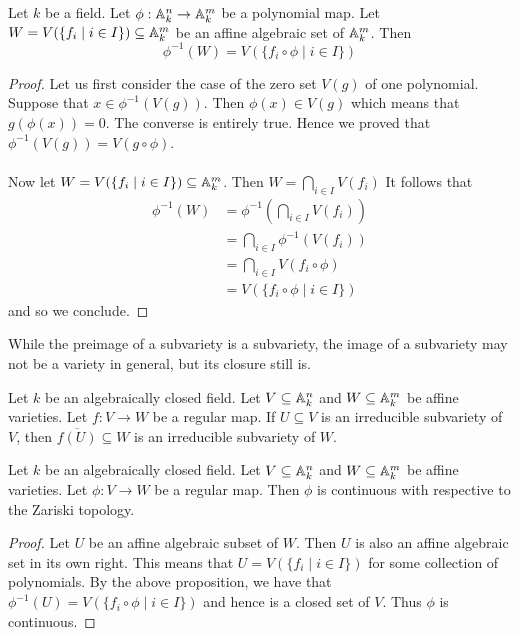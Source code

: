 \documentclass[a4paper]{article}
\begin{document}
\begin{prp}{}{} Let $k$ be a field. Let $\phi:\mathbb{A}_k^n\to\mathbb{A}_k^m$ be a polynomial map. Let $W=V(\{f_i\;|\;i\in I\})\subseteq\mathbb{A}_k^m$ be an affine algebraic set of $\mathbb{A}_k^m$. Then $$\phi^{-1}(W)=V(\{f_i\circ\phi\;|\;i\in I\})$$ \tcbline
\begin{proof}
Let us first consider the case of the zero set $V(g)$ of one polynomial. Suppose that $x\in\phi^{-1}(V(g))$. Then $\phi(x)\in V(g)$ which means that $g(\phi(x))=0$. The converse is entirely true. Hence we proved that $\phi^{-1}(V(g))=V(g\circ\phi)$. \\~\\

Now let $W=V(\{f_i\;|\;i\in I\})\subseteq\mathbb{A}_k^m$. Then $W=\bigcap_{i\in I}V(f_i)$ It follows that 
\begin{align*}
\phi^{-1}(W)&=\phi^{-1}\left(\bigcap_{i\in I}V(f_i)\right)\\
&=\bigcap_{i\in I}\phi^{-1}\left(V(f_i)\right)\\
&=\bigcap_{i\in I}V(f_i\circ\phi)\\
&=V(\{f_i\circ\phi\;|\;i\in I\})
\end{align*}
and so we conclude. 
\end{proof}
\end{prp}

While the preimage of a subvariety is a subvariety, the image of a subvariety may not be a variety in general, but its closure still is. 

\begin{lmm}{}{} Let $k$ be an algebraically closed field. Let $V\subseteq\mathbb{A}_k^n$ and $W\subseteq\mathbb{A}_k^m$ be affine varieties. Let $f:V\to W$ be a regular map. If $U\subseteq V$ is an irreducible subvariety of $V$, then $\overline{f(U)}\subseteq W$ is an irreducible subvariety of $W$. 
\end{lmm}

\begin{thm}{}{} Let $k$ be an algebraically closed field. Let $V\subseteq\mathbb{A}_k^n$ and $W\subseteq\mathbb{A}_k^m$ be affine varieties. Let $\phi:V\to W$ be a regular map. Then $\phi$ is continuous with respective to the Zariski topology. \tcbline
\begin{proof}
Let $U$ be an affine algebraic subset of $W$. Then $U$ is also an affine algebraic set in its own right. This means that $U=V(\{f_i\;|\;i\in I\})$ for some collection of polynomials. By the above proposition, we have that $\phi^{-1}(U)=V(\{f_i\circ\phi\;|\;i\in I\})$ and hence is a closed set of $V$. Thus $\phi$ is continuous. 
\end{proof}
\end{thm}
\end{document}
